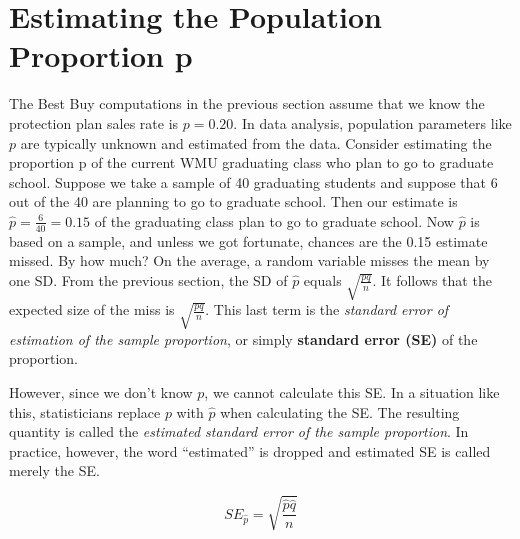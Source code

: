 \documentclass[11pt, chapterprefix=true]{scrbook}\usepackage[]{graphicx}\usepackage[]{color}
\begin{document}
\section{Estimating the Population Proportion p}

The Best Buy computations in the previous section assume that we know the protection plan sales rate is $p = 0.20$.  In data analysis, population parameters like $p$ are typically unknown and estimated from the data.  Consider estimating the proportion p of the current WMU graduating class who plan to go to graduate school.  Suppose we take a sample of 40 graduating students and suppose that 6 out of the 40 are planning to go to graduate school.  Then our estimate is $\hat{p} = \frac{6}{40} = 0.15$ of the graduating class plan to go to graduate school.  Now $\hat{p}$ is based on a sample, and unless we got fortunate, chances are the 0.15 estimate missed.  By how much?  On the average, a random variable misses the mean by one SD.  From the previous section, the SD of $\hat{p}$  equals $\sqrt{ \frac{pq}{n}}$.   It follows that the expected size of the miss is $\sqrt{ \frac{pq}{n}}$.   This last term is the \textit{standard error of estimation of the sample proportion}, or simply \textbf{standard error (SE)} of the proportion.

However, since we don't know $p$, we cannot calculate this SE.  In a situation like this, statisticians replace $p$ with $\hat{p}$  when calculating the SE.  The resulting quantity is called the \textit{estimated standard error of the sample proportion}.  In practice, however, the word ``estimated'' is dropped and estimated SE is called merely the SE.


\begin{equation*}
SE_{\hat{p}} = \sqrt{\frac{\hat{p}\hat{q}}{n}}
\end{equation*}
\end{document}
